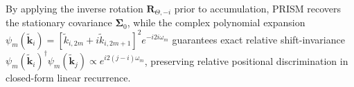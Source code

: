 \documentclass[11pt,a4paper]{article}
\begin{document}
By applying the inverse rotation $\mathbf{R}_{\Theta, -i}$ prior to accumulation, PRISM recovers the stationary covariance $\mathbf{\Sigma}_0$, while the complex polynomial expansion $\psi_m(\tilde{\mathbf{k}}_i) = [\tilde{k}_{i,2m} + i \tilde{k}_{i,2m+1}]^2 e^{-i 2 i \omega_m}$ guarantees exact relative shift-invariance $\psi_m(\tilde{\mathbf{k}}_i)^\dagger \psi_m(\tilde{\mathbf{k}}_j) \propto e^{i 2 (j-i) \omega_m}$, preserving relative positional discrimination in closed-form linear recurrence.
\end{document}
